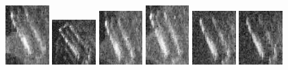 \begin{figure}
    \includegraphics[width=0.15\textwidth]{chapters/images/dataset/all-class-images/bottle/bottle-407.jpg}
    \includegraphics[width=0.15\textwidth]{chapters/images/dataset/all-class-images/bottle/bottle-174.jpg}
    \includegraphics[width=0.15\textwidth]{chapters/images/dataset/all-class-images/bottle/bottle-294.jpg}
    \includegraphics[width=0.15\textwidth]{chapters/images/dataset/all-class-images/bottle/bottle-431.jpg}
    \includegraphics[width=0.15\textwidth]{chapters/images/dataset/all-class-images/bottle/bottle-275.jpg}
    \includegraphics[width=0.15\textwidth]{chapters/images/dataset/all-class-images/bottle/bottle-272.jpg}
    

\end{figure}
